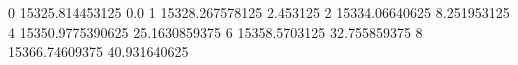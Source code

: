 0 15325.814453125 0.0
1 15328.267578125 2.453125
2 15334.06640625 8.251953125
4 15350.9775390625 25.1630859375
6 15358.5703125 32.755859375
8 15366.74609375 40.931640625
